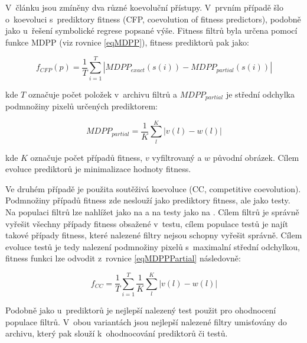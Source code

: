 V~článku \cite{SikuPPSN} jsou zmíněny dva různé koevoluční přístupy. V~prvním případě šlo o~koevoluci s~prediktory fitness (CFP, coevolution of fitness predictors), podobně jako u~řešení symbolické regrese popsané výše. Fitness filtrů byla určena pomocí funkce MDPP (viz rovnice \ref{eqMDPP}), fitness prediktorů pak jako:

\begin{equation}
    \label{eqFpredictorIF}
    f_{\mathit{CFP}} \left( p \right) = \frac{1}{T} \sum\limits_{i=1}^{T} \left| \mathit{MDPP_{exact}} \left( s \left( i \right) \right) - \mathit{MDPP_{partial}} \left( s \left( i \right) \right) \right|
\end{equation}

\noindent{}kde $T$ označuje počet položek v~archivu filtrů a $\mathit{MDPP_{partial}}$ je střední odchylka podmnožiny pixelů určených prediktorem:

\begin{equation}
    \label{eqMDPPPartial}
    \mathit{MDPP_{partial}} = \frac{1}{K} \sum\limits_l^K \left| v\left( l \right) - w\left( l \right) \right|
\end{equation}

\noindent{}kde $K$ označuje počet případů fitness, $v$ vyfiltrovaný a $w$ původní obrázek. Cílem evoluce prediktorů je minimalizace hodnoty fitness.

Ve druhém případě je použita soutěživá koevoluce (CC, competitive coevolution). Podmnožiny případů fitness zde neslouží jako prediktory fitness, ale jako testy. Na populaci filtrů lze nahlížet jako na  a na testy jako na . Cílem filtrů je správně vyřešit všechny případy fitness obsažené v~testu, cílem populace testů je najít takové případy fitness, které nalezené filtry nejsou schopny vyřešit správně.
Cílem evoluce testů je tedy nalezení podmnožiny pixelů s~maximalní střední odchylkou, fitness funkci lze odvodit z~rovnice \ref{eqMDPPPartial} následovně:

\begin{equation}
    \label{eqFtestsIF}
    f_{\mathit{CC}} = \frac{1}{T} \sum\limits_{i=1}^{T} \frac{1}{K} \sum\limits_l^K \left| v\left( l \right) - w\left( l \right) \right|
\end{equation}

Podobně jako u~prediktorů je nejlepší nalezený test použit pro ohodnocení populace filtrů. V~obou variantách jsou nejlepší nalezené filtry umisťovány do archivu, který pak slouží k~ohodnocování prediktorů či testů.


